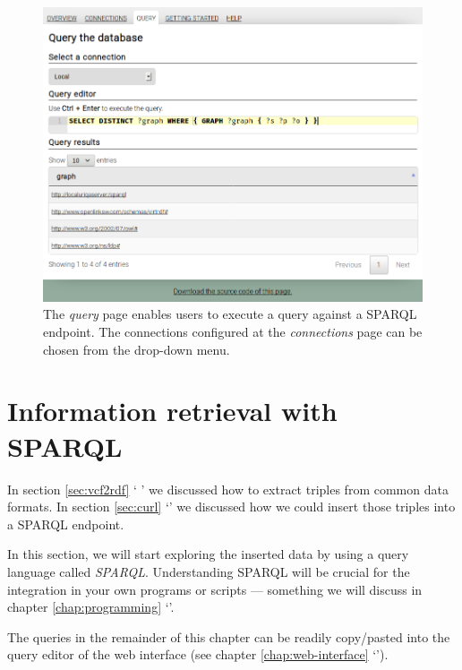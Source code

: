 \documentclass[11pt,a4paper,oneside]{book}
\begin{document}
  \begin{figure}[h]
    \begin{center}
      \includegraphics[width=1.0\textwidth]{figures/web-query.png}
    \end{center}
    \caption{The \emph{query} page enables users to execute a query against a
      SPARQL endpoint.  The connections configured at the \emph{connections} page
      can be chosen from the drop-down menu.}
    \label{fig:web-query}
  \end{figure}

\chapter{Information retrieval with SPARQL}

  In section \ref{sec:vcf2rdf} {\color{LinkGray}`%
  '} we discussed how to extract triples from common data
  formats.  In section \ref{sec:curl} {\color{LinkGray}`'} we
  discussed how we could insert those triples into a SPARQL endpoint.

  In this section, we will start exploring the inserted data by using a
  query language called \emph{SPARQL}.  Understanding SPARQL will be crucial
  for the integration in your own programs or scripts --- something we will
  discuss in chapter \ref{chap:programming} {\color{LinkGray}%
  `'}.

  The queries in the remainder of this chapter can be readily copy/pasted into
  the query editor of the web interface (see chapter \ref{chap:web-interface}
  {\color{LinkGray}`'}).
\end{document}
